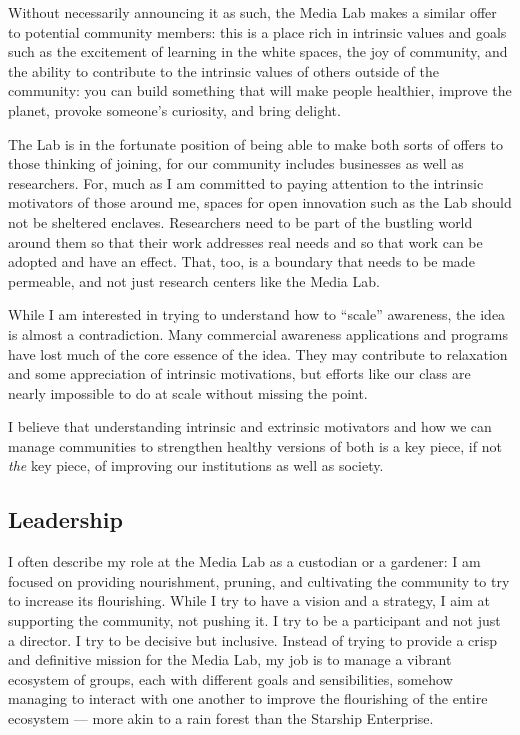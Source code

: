 Without necessarily announcing it as such, the Media Lab makes a similar offer to potential community members: this is a place rich in intrinsic values and goals such as the excitement of learning in the white spaces, the joy of community, and the ability to contribute to the intrinsic values of others outside of the community: you can build something that will make people healthier, improve the planet, provoke someone's curiosity, and bring delight.

The Lab is in the fortunate position of being able to make both sorts of offers to those thinking of joining, for our community includes businesses as well as researchers. For, much as I am committed to paying attention to the intrinsic motivators of those around me, spaces for open innovation such as the Lab should not be sheltered enclaves. Researchers need to be part of the bustling world around them so that their work addresses real needs and so that work can be adopted and have an effect. That, too, is a boundary that needs to be made permeable, and not just research centers like the Media Lab.

While I am interested in trying to understand how to ``scale'' awareness, the idea is almost a contradiction. Many commercial awareness applications and programs have lost much of the core essence of the idea. They may contribute to relaxation and some appreciation of intrinsic motivations, but efforts like our class are nearly impossible to do at scale without missing the point.

I believe that understanding intrinsic and extrinsic motivators and how we can manage communities to strengthen healthy versions of both is a key piece, if not \emph{the} key piece, of improving our institutions as well as society.

\subsection{Leadership}

I often describe my role at the Media Lab as a custodian or a gardener: I am focused on providing nourishment, pruning, and cultivating the community to try to increase its flourishing. While I try to have a vision and a strategy, I aim at supporting the community, not pushing it. I try to be a participant and not just a director. I try to be decisive but inclusive. Instead of trying to provide a crisp and definitive mission for the Media Lab, my job is to manage a vibrant ecosystem of groups, each with different goals and sensibilities, somehow managing to interact with one another to improve the flourishing of the entire ecosystem --- more akin to a rain forest than the Starship Enterprise.

